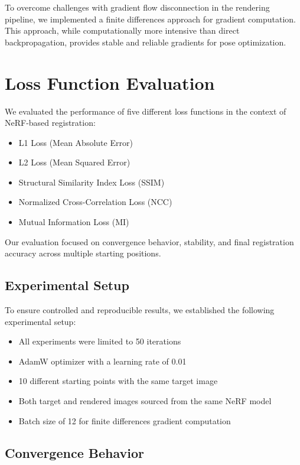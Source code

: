 To overcome challenges with gradient flow disconnection in the rendering pipeline, we implemented a finite differences approach for gradient computation. This approach, while computationally more intensive than direct backpropagation, provides stable and reliable gradients for pose optimization.

\section{Loss Function Evaluation}

We evaluated the performance of five different loss functions in the context of NeRF-based registration:

\begin{itemize}
    \item L1 Loss (Mean Absolute Error)
    \item L2 Loss (Mean Squared Error)
    \item Structural Similarity Index Loss (SSIM)
    \item Normalized Cross-Correlation Loss (NCC)
    \item Mutual Information Loss (MI)
\end{itemize}

Our evaluation focused on convergence behavior, stability, and final registration accuracy across multiple starting positions.

\subsection{Experimental Setup}

To ensure controlled and reproducible results, we established the following experimental setup:

\begin{itemize}
    \item All experiments were limited to 50 iterations
    \item AdamW optimizer with a learning rate of 0.01
    \item 10 different starting points with the same target image
    \item Both target and rendered images sourced from the same NeRF model
    \item Batch size of 12 for finite differences gradient computation
\end{itemize}

\subsection{Convergence Behavior}

